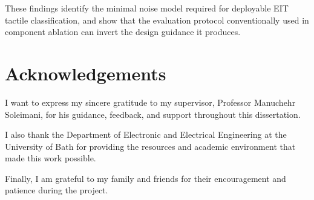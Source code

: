 \documentclass[12pt, a4paper, oneside]{report}
\begin{document}
These findings identify the minimal noise model required for deployable EIT tactile classification, and show that the evaluation protocol conventionally used in component ablation can invert the design guidance it produces.

\newpage
\chapter*{Acknowledgements}

I want to express my sincere gratitude to my supervisor, Professor Manuchehr Soleimani, for his guidance, feedback, and support throughout this dissertation.

I also thank the Department of Electronic and Electrical Engineering at the University of Bath for providing the resources and academic environment that made this work possible.

Finally, I am grateful to my family and friends for their encouragement and patience during the project.

\tableofcontents
\listoffigures
\listoftables
\printglossary[type=\acronymtype, title=List of Abbreviations]









\printbibliography[heading=bibintoc, title={References}]

\begin{appendices}

\end{appendices}
\end{document}
